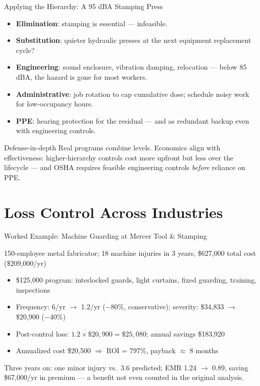 \documentclass[11pt, aspectratio=169]{beamer}
\begin{document}
\begin{frame}{Applying the Hierarchy: A 95 dBA Stamping Press}
\begin{itemize}
  \item \textbf{Elimination}: stamping is essential --- infeasible.
  \item \textbf{Substitution}: quieter hydraulic presses at the next equipment replacement cycle?
  \item \textbf{Engineering}: sound enclosure, vibration damping, relocation --- below 85 dBA, the hazard is gone for most workers.
  \item \textbf{Administrative}: job rotation to cap cumulative dose; schedule noisy work for low-occupancy hours.
  \item \textbf{PPE}: hearing protection for the residual --- and as redundant backup even with engineering controls.
\end{itemize}
\medskip
\begin{block}{Defense-in-depth}
Real programs combine levels. Economics align with effectiveness: higher-hierarchy controls cost more upfront but less over the lifecycle --- and OSHA requires feasible engineering controls \emph{before} reliance on PPE.
\end{block}
\end{frame}

\section{Loss Control Across Industries}

\begin{frame}{Worked Example: Machine Guarding at Mercer Tool \& Stamping}
\begin{exampleblock}{150-employee metal fabricator; 18 machine injuries in 3 years, \$627{,}000 total cost (\$209{,}000/yr)}
\begin{itemize}
  \item \$125{,}000 program: interlocked guards, light curtains, fixed guarding, training, inspections
  \item Frequency: 6/yr $\rightarrow$ 1.2/yr ($-80\%$, conservative); severity: \$34{,}833 $\rightarrow$ \$20{,}900 ($-40\%$)
  \item Post-control loss: $1.2 \times \$20{,}900 = \$25{,}080$; annual savings \$183{,}920
  \item Annualized cost \$20{,}500 $\Rightarrow$ \alert{ROI = 797\%, payback $\approx$ 8 months}
\end{itemize}
\end{exampleblock}
\medskip
Three years on: one minor injury vs.\ 3.6 predicted; EMR 1.24 $\rightarrow$ 0.89, saving \$67{,}000/yr in premium --- a benefit not even counted in the original analysis.
\end{frame}
\end{document}
